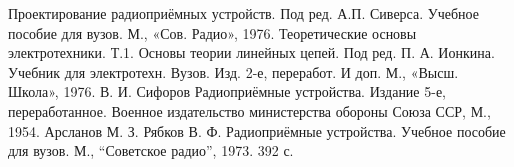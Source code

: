 \begin{thebibliography}{99}
   Проектирование  радиоприёмных  устройств.  Под  ред.  А.П.  Сиверса. Учебное пособие для вузов. М., «Сов. Радио», 1976. 
   Теоретические  основы  электротехники.  Т.1.  Основы  теории  линейных цепей.  Под  ред.  П.  А.  Ионкина.  Учебник  для  электротехн.  Вузов.  Изд.  2-е, переработ. И доп. М., «Высш. Школа», 1976. 
     В. И. Сифоров  Радиоприёмные  устройства. Издание 5-е, переработанное.  Военное издательство министерства обороны Союза ССР, М., 1954.
   Арсланов  М.  З.  Рябков  В.  Ф.  Радиоприёмные  устройства.  Учебное пособие для вузов. М., “Советское радио”, 1973. 392 с. 
\end{thebibliography}



